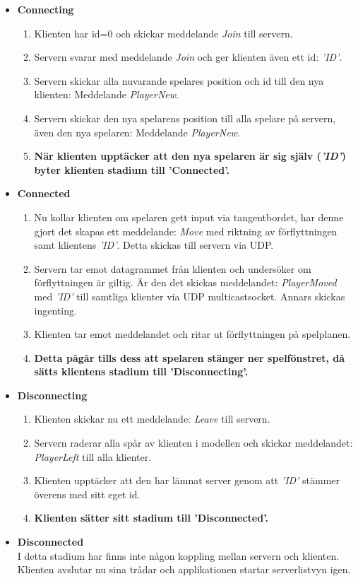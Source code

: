 \documentclass[10pt, titlepage, oneside, a4paper]{article}
\begin{document}
				\begin{itemize}
					\item \textbf{Connecting}
						\begin{enumerate}
							\item Klienten har id=0 och skickar meddelande \textit{Join} till servern.
							\item Servern svarar med meddelande \textit{Join} och ger klienten även ett id: \textit{'ID'}.
							\item Servern skickar alla nuvarande spelares position och id till den nya klienten: Meddelande \textit{PlayerNew}.
							\item Servern skickar den nya spelarens position till alla spelare på servern, även den nya spelaren: Meddelande \textit{PlayerNew}.
							\item \textbf{När klienten upptäcker att den nya spelaren är sig själv (\textit{'ID'}) byter klienten stadium till 'Connected'.}
						\end{enumerate}
						
					\newpage
					\item \textbf{Connected}
						\begin{enumerate}
							\item Nu kollar klienten om spelaren gett input via tangentbordet, har denne gjort det skapas ett meddelande: \textit{Move} med riktning av förflyttningen samt klientens \textit{'ID'}. Detta skickas till servern via UDP.
							\item Servern tar emot datagrammet från klienten och undersöker om förflyttningen är giltig. Är den det skickas meddelandet: \textit{PlayerMoved} med \textit{'ID'} till samtliga klienter via UDP multicastsocket. Annars skickas ingenting.
							\item Klienten tar emot meddelandet och ritar ut förflyttningen på spelplanen.
							\item \textbf{Detta pågår tills dess att spelaren stänger ner spelfönstret, då sätts klientens stadium till 'Disconnecting'.}
						\end{enumerate}
					\item \textbf{Disconnecting}
						\begin{enumerate}
							\item Klienten skickar nu ett meddelande: \textit{Leave} till servern.
							\item Servern raderar alla spår av klienten i modellen och skickar meddelandet: \textit{PlayerLeft} till alla klienter.
							\item Klienten upptäcker att den har lämnat server genom att \textit{'ID'} stämmer överens med sitt eget id.
							\item \textbf{Klienten sätter sitt stadium till 'Disconnected'.}
						\end{enumerate}
					\item \textbf{Disconnected}\\I detta stadium har finns inte någon koppling mellan servern och klienten. Klienten avslutar nu sina trådar och applikationen startar serverlistvyn igen.
				\end{itemize}
				
\end{document}
